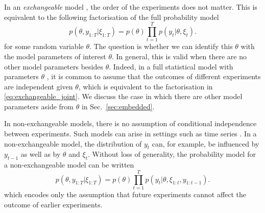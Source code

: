 \documentclass[a4paper, 10pt]{report}
\theoremstyle{plain}
\begin{document}
	In an \emph{exchangeable} model \citep{bloem2019probabilistic}, the order of the experiments does not matter. This is equivalent \citep{oksendal2003stochastic} to the following factorisation of the full probability model
	\begin{equation}
	\label{eq:exchangeable_joint}
	p(\theta,y_{1:T}|\xi_{1:T}) = p(\theta)\prod_{t=1}^T p(y_t|\theta,\xi_t).
	\end{equation}
	for some random variable $\theta$.
	The question is whether we can identify this $\theta$ with the model parameters of interest $\theta$.
	In general, this is valid when there are no other model parameters besides $\theta$.
	Indeed, in a full statistical model with parameters $\theta$ \citep{cox2006principles}, it is common to assume that the outcomes of different experiments are independent given $\theta$, which is equivalent to the factorisation in \eqref{eq:exchangeable_joint}.
	We discuss the case in which there are other model parameters aside from $\theta$ in Sec.~\ref{sec:embedded}.
	
	In non-exchangeable models, there is no assumption of conditional independence between experiments.
	Such models can arise in settings such as time series \citep{pole2018applied}. In a non-exchangeable model, the distribution of $y_t$ can, for example, be influenced by $y_{t-1}$ as well as by $\theta$ and $\xi_t$. Without loss of generality, the probability model for a non-exchangeable model can be written
	\begin{equation}
	p(\theta,y_{1:T}|\xi_{1:T}) = p(\theta)\prod_{t=1}^T p(y_t|\theta,\xi_{1:t},y_{1:t-1}).
	\end{equation}
	which encodes only the assumption that future experiments cannot affect the outcome of earlier experiments. 
	
\end{document}
